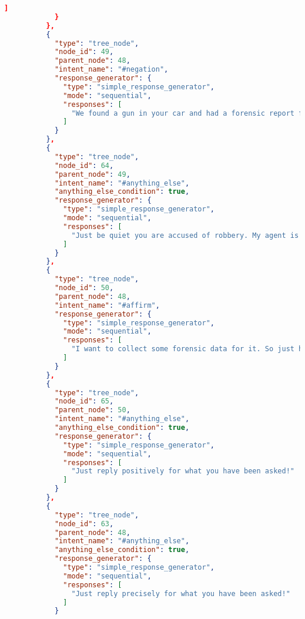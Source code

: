 \begin{appendix}
\begin{lstlisting}[language=json, firstnumber=1]
              ]
            }
          },
          {
            "type": "tree_node",
            "node_id": 49,
            "parent_node": 48,
            "intent_name": "#negation",
            "response_generator": {
              "type": "simple_response_generator",
              "mode": "sequential",
              "responses": [
                "We found a gun in your car and had a forensic report for it. And your fingerprints on that gun matches the one on the cash register. So you are being arrested for a robbery. You have a right to remain silent. Anything you say now will be used against you in the court of law. Hope you will enjoy your imprisonment. Hope to not see you again!"
              ]
            }
          },
          {
            "type": "tree_node",
            "node_id": 64,
            "parent_node": 49,
            "intent_name": "#anything_else",
            "anything_else_condition": true,
            "response_generator": {
              "type": "simple_response_generator",
              "mode": "sequential",
              "responses": [
                "Just be quiet you are accused of robbery. My agent is on his way to take you with him."
              ]
            }
          },
          {
            "type": "tree_node",
            "node_id": 50,
            "parent_node": 48,
            "intent_name": "#affirm",
            "response_generator": {
              "type": "simple_response_generator",
              "mode": "sequential",
              "responses": [
                "I want to collect some forensic data for it. So just hand it over to me. My owner will collect it from you soon."
              ]
            }
          },
          {
            "type": "tree_node",
            "node_id": 65,
            "parent_node": 50,
            "intent_name": "#anything_else",
            "anything_else_condition": true,
            "response_generator": {
              "type": "simple_response_generator",
              "mode": "sequential",
              "responses": [
                "Just reply positively for what you have been asked!"
              ]
            }
          },
          {
            "type": "tree_node",
            "node_id": 63,
            "parent_node": 48,
            "intent_name": "#anything_else",
            "anything_else_condition": true,
            "response_generator": {
              "type": "simple_response_generator",
              "mode": "sequential",
              "responses": [
                "Just reply precisely for what you have been asked!"
              ]
            }

\end{lstlisting}
\end{appendix}
